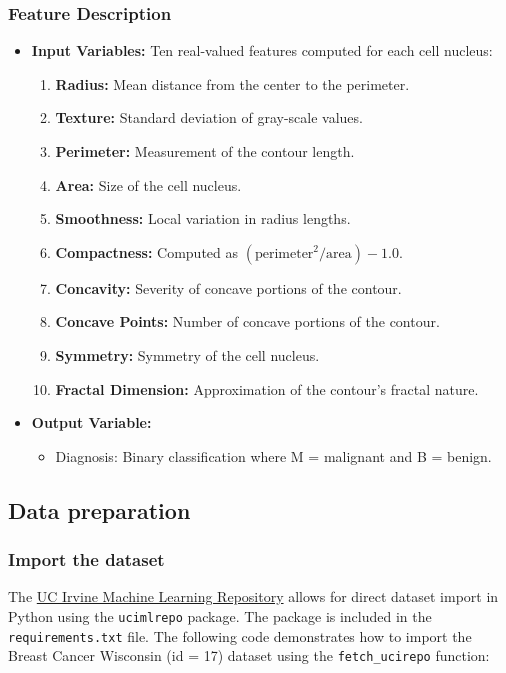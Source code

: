 \subsubsection*{Feature Description}
\begin{itemize}
    \item \textbf{Input Variables:} Ten real-valued features computed for each cell nucleus:
    \begin{enumerate}
        \item \textbf{Radius:} Mean distance from the center to the perimeter.
        \item \textbf{Texture:} Standard deviation of gray-scale values.
        \item \textbf{Perimeter:} Measurement of the contour length.
        \item \textbf{Area:} Size of the cell nucleus.
        \item \textbf{Smoothness:} Local variation in radius lengths.
        \item \textbf{Compactness:} Computed as $(\text{perimeter}^2 / \text{area}) - 1.0$.
        \item \textbf{Concavity:} Severity of concave portions of the contour.
        \item \textbf{Concave Points:} Number of concave portions of the contour.
        \item \textbf{Symmetry:} Symmetry of the cell nucleus.
        \item \textbf{Fractal Dimension:} Approximation of the contour's fractal nature.
    \end{enumerate}
    \item \textbf{Output Variable:}
    \begin{itemize}
        \item Diagnosis: Binary classification where M = malignant and B = benign.
    \end{itemize}
\end{itemize}
\subsection{Data preparation}

\subsubsection{Import the dataset}

The \href{https://archive.ics.uci.edu/}{UC Irvine Machine Learning Repository} allows for direct dataset import in Python using the \texttt{ucimlrepo} package. The package is included in the \texttt{requirements.txt} file. The following code demonstrates how to import the Breast Cancer Wisconsin (id = 17) dataset using the \texttt{fetch\_ucirepo} function:

